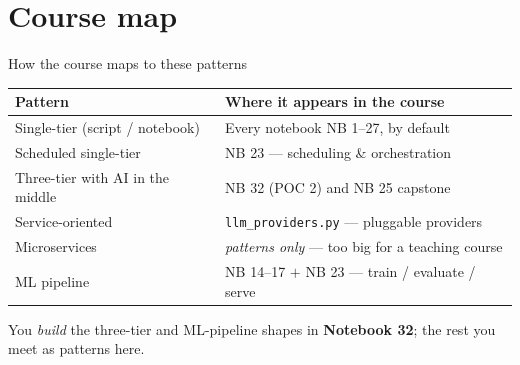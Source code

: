 \documentclass[aspectratio=169,11pt]{beamer}
\begin{document}
\section{Course map}
\begin{frame}{How the course maps to these patterns}
  \small
  \begin{center}
  \begin{tabular}{ll}
    \toprule
    \textbf{Pattern} & \textbf{Where it appears in the course} \\
    \midrule
    Single-tier (script / notebook) & Every notebook NB 1--27, by default \\
    Scheduled single-tier           & NB 23 --- scheduling \& orchestration \\
    Three-tier with AI in the middle& NB 32 (POC 2) and NB 25 capstone \\
    Service-oriented                & \texttt{llm\_providers.py} --- pluggable providers \\
    Microservices                   & \emph{patterns only} --- too big for a teaching course \\
    ML pipeline                     & NB 14--17 $+$ NB 23 --- train / evaluate / serve \\
    \bottomrule
  \end{tabular}
  \end{center}
  \vspace{4pt}
  {\footnotesize You \emph{build} the three-tier and ML-pipeline shapes in \textbf{Notebook 32}; the rest you meet as patterns here.}
\end{frame}
\end{document}
